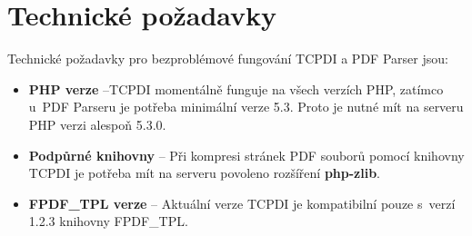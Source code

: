 \section{Technické požadavky}
Technické požadavky pro bezproblémové fungování TCPDI a PDF Parser jsou:
\begin{itemize} 
	\item \textbf{PHP verze} --TCPDI  momentálně funguje na všech verzích PHP, zatímco u~PDF Parseru je potřeba minimální verze 5.3. Proto je nutné mít na serveru PHP verzi alespoň 5.3.0.
	\item \textbf{Podpůrné knihovny} -- Při kompresi stránek PDF souborů pomocí knihovny TCPDI je potřeba mít na serveru povoleno rozšíření \textbf{php-zlib}.
	\item \textbf{FPDF\_TPL verze} -- Aktuální verze TCPDI je kompatibilní pouze s~verzí 1.2.3 knihovny FPDF\_TPL. 
\end{itemize}
